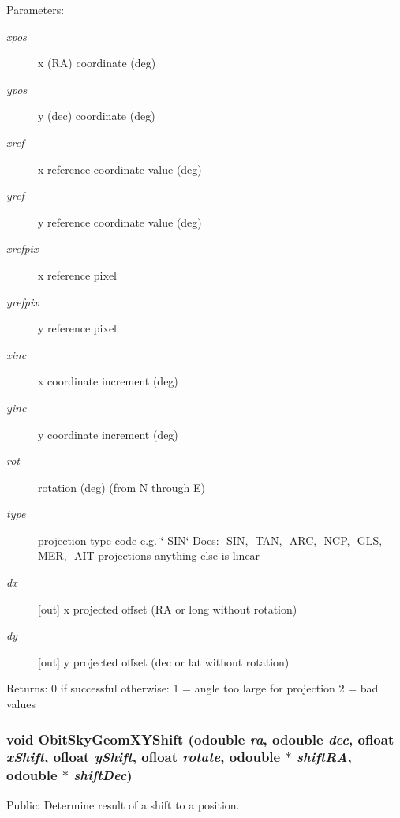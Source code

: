 \begin{Desc}
\item[Parameters:]
\begin{description}
\item[{\em xpos}]x (RA) coordinate (deg) \item[{\em ypos}]y (dec) coordinate (deg) \item[{\em xref}]x reference coordinate value (deg) \item[{\em yref}]y reference coordinate value (deg) \item[{\em xrefpix}]x reference pixel \item[{\em yrefpix}]y reference pixel \item[{\em xinc}]x coordinate increment (deg) \item[{\em yinc}]y coordinate increment (deg) \item[{\em rot}]rotation (deg) (from N through E) \item[{\em type}]projection type code e.g. \char`\"{}-SIN\char`\"{} Does: -SIN, -TAN, -ARC, -NCP, -GLS, -MER, -AIT projections anything else is linear \item[{\em dx}][out] x projected offset (RA or long without rotation) \item[{\em dy}][out] y projected offset (dec or lat without rotation) \end{description}
\end{Desc}
\begin{Desc}
\item[Returns:]0 if successful otherwise: 1 = angle too large for projection 2 = bad values \end{Desc}
\subsubsection{\setlength{\rightskip}{0pt plus 5cm}void Obit\-Sky\-Geom\-XYShift ({\bf odouble} {\em ra}, {\bf odouble} {\em dec}, {\bf ofloat} {\em x\-Shift}, {\bf ofloat} {\em y\-Shift}, {\bf ofloat} {\em rotate}, {\bf odouble} $\ast$ {\em shift\-RA}, {\bf odouble} $\ast$ {\em shift\-Dec})}\label{ObitSkyGeom_8c_a4}


Public: Determine result of a shift to a position. 

